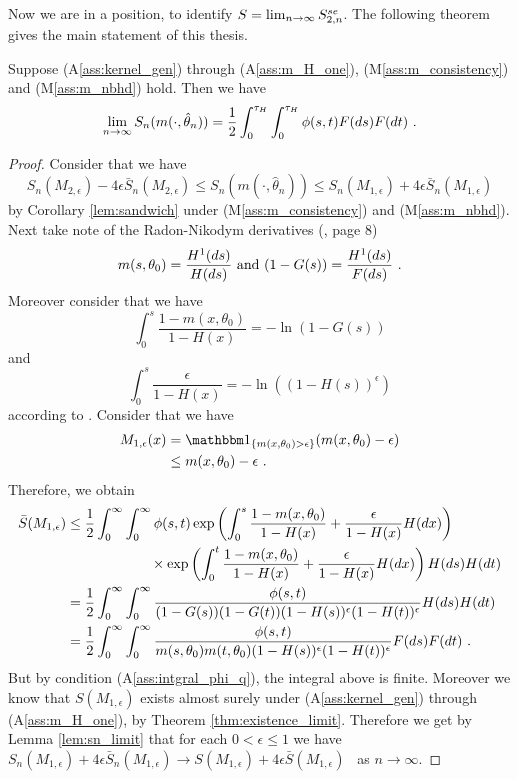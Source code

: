 Now we are in a position, to identify $S = \lim_{n\to\infty} S_{2,n}^{se}$. The following theorem gives the main statement of this thesis.
\begin{thm}
	Suppose (A\ref{ass:kernel_gen}) through (A\ref{ass:m_H_one}), (M\ref{ass:m_consistency}) and (M\ref{ass:m_nbhd}) hold. Then we have
	$$\lim\limits_{n\to\infty} S_n(m(\cdot, \hat{\theta}_n)) = \frac{1}{2}\int_{0}^{\tau_H}\int_{0}^{\tau_H} \phi(s,t) F(ds)F(dt)\textrm{ .}$$
	\label{thm:snmn_limit}
	\begin{proof}
		Consider that we have
		$$S_n(M_{2,\epsilon}) - 4\epsilon \bar{S}_n(M_{2,\epsilon}) \leq S_n(m(\cdot, \hat\theta_n)) \leq S_n(M_{1,\epsilon}) + 4\epsilon \bar{S}_n(M_{1,\epsilon})$$
		by Corollary \ref{lem:sandwich} under (M\ref{ass:m_consistency}) and (M\ref{ass:m_nbhd}). Next take note of the Radon-Nikodym derivatives (\cf \cite{dikta2000strong}, page 8)
		$$m(s,\theta_0) = \frac{H^1(ds)}{H(ds)} \textrm{ and } (1-G(s)) = \frac{H^1(ds)}{F(ds)}\textrm{ .}$$
		Moreover consider that we have
		$$\int_{0}^{s} \frac{1-m(x,\theta_0)}{1-H(x)} = -\ln(1-G(s))$$
		and 
		$$\int_{0}^{s} \frac{\epsilon}{1-H(x)} = -\ln((1-H(s))^\epsilon)$$
		according to \cite{dikta2000strong}.
		Consider that we have 
		\begin{align*}
			M_{1,\epsilon}(x) &= \I{ m(x,\theta_0)>\epsilon}(m(x,\theta_0)-\epsilon)\\
			&\leq m(x,\theta_0)-\epsilon \mdot
		\end{align*}
		Therefore, we obtain
		\begin{align*}
			\bar{S}(M_{1,\epsilon}) &\leq \frac{1}{2}\int_{0}^{\infty} \int_{0}^{\infty} \phi(s,t)  \exp\left(\int_{0}^{s} \frac{1-m(x,\theta_0)}{1-H(x)} + \frac{\epsilon}{1-H(x)} H(dx)\right)\\
			&\qquad\qquad\qquad \times \exp\left(\int_{0}^{t} \frac{1-m(x,\theta_0)}{1-H(x)} + \frac{\epsilon}{1-H(x)} H(dx) \right)H(ds)H(dt)\\
			&= \frac{1}{2}\int_{0}^{\infty} \int_{0}^{\infty} \frac{\phi(s,t)}{(1-G(s))(1-G(t))(1-H(s))^\epsilon(1-H(t))^\epsilon} H(ds)H(dt)\\
			&= \frac{1}{2}\int_{0}^{\infty} \int_{0}^{\infty} \frac{\phi(s,t)}{m(s,\theta_0)m(t,\theta_0)(1-H(s))^\epsilon(1-H(t))^\epsilon} F(ds)F(dt)\textrm{ .}
		\end{align*}
		But by condition (A\ref{ass:intgral_phi_q}), the integral above is finite. Moreover we know that $S(M_{1,\epsilon})$ exists almost surely under (A\ref{ass:kernel_gen}) through (A\ref{ass:m_H_one}), by Theorem \ref{thm:existence_limit}. Therefore we get by Lemma \ref{lem:sn_limit} that for each $0<\epsilon\leq1$ we have $S_n(M_{1,\epsilon}) + 4\epsilon \bar{S}_n(M_{1,\epsilon}) \to S(M_{1,\epsilon}) + 4\epsilon \bar{S}(M_{1,\epsilon})$ \wpo\ as $n\to\infty$. 

\end{proof}
\end{thm}
